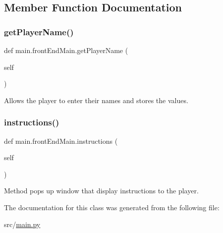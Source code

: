 \subsection{Member Function Documentation}
\mbox{\label{classmain_1_1front_end_main_a7aed02a11e563d6ac2c6f0bb626545ca}} 
\subsubsection{\texorpdfstring{get\+Player\+Name()}{getPlayerName()}}
{\footnotesize\ttfamily def main.\+front\+End\+Main.\+get\+Player\+Name (\begin{DoxyParamCaption}\item[{}]{self }\end{DoxyParamCaption})}



Allows the player to enter their names and stores the values. 

\mbox{\label{classmain_1_1front_end_main_a35eedac35885932dbccfc15f66c636ef}} 
\subsubsection{\texorpdfstring{instructions()}{instructions()}}
{\footnotesize\ttfamily def main.\+front\+End\+Main.\+instructions (\begin{DoxyParamCaption}\item[{}]{self }\end{DoxyParamCaption})}



Method pops up window that display instructions to the player. 



The documentation for this class was generated from the following file\+:\begin{DoxyCompactItemize}
\item 
src/\hyperlink{main_8py}{main.\+py}\end{DoxyCompactItemize}

